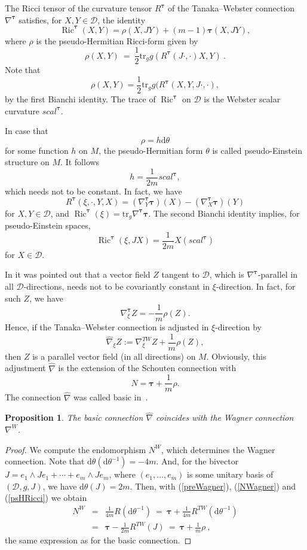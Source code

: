 \documentclass{amsart}
\theoremstyle{plain}
\newtheorem{prop}[theorem]{Proposition}
\theoremstyle{definition}
\newcommand{\Ric}{\operatorname{Ric}}
\newcommand{\bt}{{\boldsymbol{\tau}}}
\newcommand{\1}{\mathbf{1}}
\newcommand{\tr}{\mathrm{tr}}
\newcommand{\D}{{\mathcal D}}
\renewcommand{\d}{\mathrm{d}}
\newcommand{\+}{\oplus}
\begin{document}
The Ricci tensor of the curvature tensor $R^\bt$ of the Tanaka--Webster connection $\nabla^\bt$ satisfies, for $X,Y\in \D$, the identity 
\begin{equation}\label{RicTW}\Ric^{\bt}(X,Y)=\rho(X,JY)+(m-1)\bt(X,JY),\end{equation}
where $\rho$ is the pseudo-Hermitian Ricci-form given by
\begin{equation}\label{psHRicci}
\rho(X,Y)\ =\ \frac{1}{2}\tr_gg(R^\bt(J\cdot, \cdot)X,Y)\ .
\end{equation}
Note that $$\rho(X,Y)=\frac{1}{2}\tr_gg(R^\bt(X,Y,J\cdot,\cdot),$$ by the first Bianchi identity.
The trace of $\Ric^{\bt}$ on $\D$ is the Webster scalar curvature $scal^{\bt}$. 

In case that $$\rho=h \d\theta$$ for some  function $h$ on $M$, 
the pseudo-Hermitian form $\theta$ is called pseudo-Einstein structure on $M$. It follows $$h=\frac{1}{2m}scal^{\bt},$$ which 
needs not to be constant. 
In fact, we have $$R^{\bt}(\xi,\cdot,Y,X)=(\nabla^{\bt}_Y\bt)(X)- (\nabla^{\bt}_X\bt)(Y)$$ for $X,Y\in \D$, and $\Ric^{\bt}(\xi)=\tr_g\nabla^{\bt}\bt$.
The second Bianchi identity implies, for pseudo-Einstein spaces, $$\Ric^{\bt}(\xi,JX)=\frac{1}{2m}X(scal^{\bt})$$ for $X\in \D$. 


In \cite{Leitner18} it was pointed out that a vector field $Z$ tangent to $\D$, which is $\nabla^{\bt}$-parallel in all $\D$-directions, needs not to be
covariantly constant in $\xi$-direction. In fact, for such $Z$, we have $$\nabla^{\bt}_\xi Z=-\frac{1}{m}\rho(Z).$$ Hence, if the Tanaka--Webster
connection is adjusted in $\xi$-direction by $$\hat{\nabla}_\xi Z:=\nabla^{TW}_\xi Z+\frac{1}{m}\rho(Z),$$ then $Z$ is a parallel vector field 
(in all directions) on $M$. Obviously, this adjustment $\hat{\nabla}$ is 
the extension of the Schouten connection with $$N=\bt+\frac{1}{m}\rho.$$ The connection  $\hat{\nabla}$ was called  basic in~\cite{Leitner18}.

    \begin{prop}
        The basic connection $\hat{\nabla}$ coincides with the Wagner connection $\nabla^W$.
    \end{prop}

\begin{proof}  We compute the endomorphism $N^W$, which determines the Wagner connection.
Note that $\d\theta(\d\theta^{-1})=-4m$. And, for the bivector $J=e_1\wedge Je_1+\cdots+e_m\wedge Je_m$, 
where $(e_1,\ldots,e_m)$ is some unitary basis of $(\D,g,J)$, we have $\d\theta(J)=2m$. Then, with (\ref{preWagner}), (\ref{NWagner}) and (\ref{psHRicci})
we obtain
\begin{eqnarray*}
N^W &=&\tfrac{1}{4m}R(\d\theta^{-1})\ =\ \bt+\tfrac{1}{4m}R^{TW}(\d\theta^{-1})\\ 
&=& \bt -\tfrac{1}{2m}R^{TW}(J)\ =\ \bt+\tfrac{1}{m}\rho\ ,
\end{eqnarray*}
the same expression as for the basic connection. \end{proof}
\end{document}
